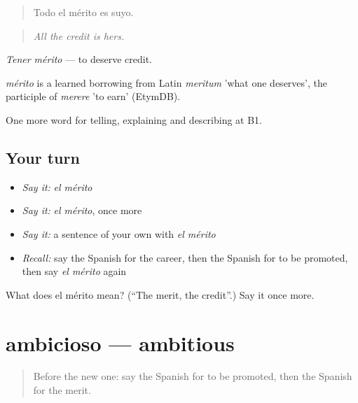 \begin{quote}
Todo el mérito es suyo.
\end{quote}

\begin{quote}
\emph{All the credit is hers.}
\end{quote}

\emph{Tener mérito} — to deserve credit.

\begin{cousinweb}
\emph{mérito} is a learned borrowing from Latin \emph{meritum} 'what one deserves', the participle of \emph{merere} 'to earn' (EtymDB).
\end{cousinweb}

\begin{grammarlens}[title={What you've built}]
One more word for telling, explaining and describing at B1.
\end{grammarlens}

\subsection*{Your turn}
\begin{itemize}
\raggedright
  \item \emph{Say it:} \emph{el mérito}
  \item \emph{Say it:} \emph{el mérito}, once more
  \item \emph{Say it:} a sentence of your own with \emph{el mérito}
  \item \emph{Recall:} say the Spanish for the career, then the Spanish for to be promoted, then say \emph{el mérito} again
\end{itemize}

\begin{tcolorbox}[breakable,colback=teal!4,colframe=teal!35!black,title={Before you move on}]
What does el mérito mean? (\textquotedblleft{}The merit, the credit\textquotedblright{}.) Say it once more.
\end{tcolorbox}
\section[ambicioso]{ambicioso — ambitious}

\label{lesson:ES-C595-ambicioso}



\begin{quote}
Before the new one: say the Spanish for to be promoted, then the Spanish for the merit.
\end{quote}

